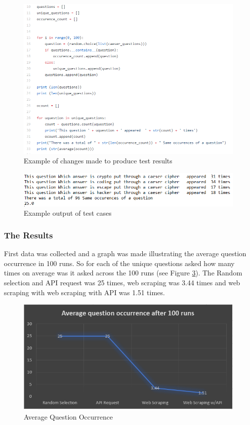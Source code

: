 \documentclass[12pt,a4paper]{article}
\begin{document}
\begin{figure}[!ht]
    \centering
    \includegraphics[width=1.0\textwidth]{Figs/testcases.PNG} 
    \caption{Example of changes made to produce test results} 
    \label{testcases}
\end{figure} 

\begin{figure}[!ht]
    \centering
    \includegraphics[width=1.0\textwidth]{Figs/exampleoutput1.PNG} 
    \caption{Example output of test cases} 
    \label{exout1}
\end{figure}  

\subsubsection{The Results} 
First data was collected and a graph was made illustrating the average question occurrence in 100 runs. So for each of the unique questions asked how many times on average was it asked across the 100 runs (see Figure \ref{r1}). The Random selection and API request was 25 times, web scraping was 3.44 times and web scraping with web scraping with API was 1.51 times.

\begin{figure}[!ht]
    \centering
    \includegraphics[width=1.0\textwidth]{Figs/results1.PNG} 
    \caption{Average Question Occurrence} 
    \label{r1}
\end{figure} 
\end{document}
